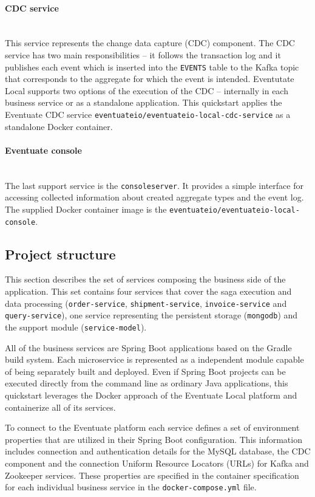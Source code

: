 \documentclass[oneside,
  digital, %
  table,   %
  lof,     %
  lot,     %
]{fithesis3}
\newcommand{\newlinepar}[1]{\paragraph{#1}\needspace{4\baselineskip}\mbox{}\\}
\begin{document}
\newlinepar{CDC service}

This service represents the change data capture (CDC) component. The CDC service has two main responsibilities -- it follows the transaction log and it publishes each event which is inserted into the \texttt{EVENTS} table to the Kafka topic that corresponds to the aggregate for which the event is intended. Eventutate Local supports two options of the execution of the CDC -- internally in each business service or as a standalone application. This quickstart applies the Eventuate CDC service \texttt{eventuateio/eventuateio-local-cdc-service} as a standalone Docker container.

\newlinepar{Eventuate console}

The last support service is the \texttt{consoleserver}. It provides a simple interface for accessing collected information about created aggregate types and the event log. The supplied Docker container image is the \texttt{eventuateio/eventuateio-local-console}.


\subsection{Project structure}

This section describes the set of services composing the business side of the application. This set contains four services that cover the saga execution and data processing (\texttt{order-service}, \texttt{shipment-service}, \texttt{invoice-service} and \texttt{query-service}), one service representing the persistent storage (\texttt{mongodb}) and the support module (\texttt{service-model}).

All of the business services are Spring Boot applications based on the Gradle \cite{gradle} build system. Each microservice is represented as a independent module capable of being separately built and deployed. Even if Spring Boot projects can be executed directly from the command line as ordinary Java applications, this quickstart leverages the Docker approach of the Eventuate Local platform and containerize all of its services.

To connect to the Eventuate platform each service defines a set of environment properties that are utilized in their Spring Boot configuration. This information includes connection and authentication details for the MySQL database, the CDC component and the connection Uniform Resource Locators (URLs) for Kafka and Zookeeper services. These properties are specified in the container specification for each individual business service in the \texttt{docker-compose.yml} file.
\end{document}
